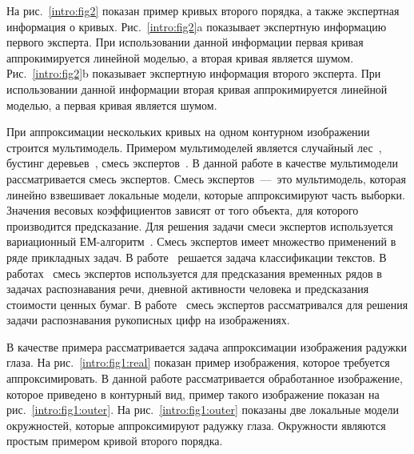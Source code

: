 \documentclass[12pt, twoside]{article}
\numberwithin{equation}{section}
\begin{document}
На рис.~\ref{intro:fig2} показан пример кривых второго порядка, а также экспертная информация о кривых. Рис.~\ref{intro:fig2}a показывает экспертную информацию первого эксперта. При использовании данной информации первая кривая аппрокимируется линейной моделью, а вторая кривая является шумом. Рис.~\ref{intro:fig2}b показывает экспертную информация второго эксперта. При использовании данной информации вторая кривая аппрокимируется линейной моделью, а первая кривая является шумом. 

При аппроксимации нескольких кривых на одном контурном изображении строится мультимодель. Примером мультимоделей является случайный лес~\cite{Ishwaran2012}, бустинг деревьев~\cite{Tianqi2016}, смесь экспертов~\cite{Yuksel2012}. В данной работе в качестве мультимодели рассматривается смесь экспертов. Смесь экспертов~---~это мультимодель, которая линейно взвешивает локальные модели, которые аппроксимируют часть выборки. Значения весовых коэффициентов зависят от того объекта, для которого производится предсказание. Для решения задачи смеси экспертов используется вариационный ЕМ-алгоритм~\cite{Dempster1977, bishop2006, Peng1996}. Смесь экспертов имеет множество применений в ряде прикладных задач. В работе~\cite{Estabrooks2001} решается задача классификации текстов. В работах~\cite{Cheung1995, Weigend2000, Cao2003, Mossavat2010, Sminchisescu2007, Tuerk2001, Yumlu2003} смесь экспертов используется для предсказания временных рядов в задачах распознавания речи, дневной активности человека и предсказания стоимости ценных бумаг. В работе~\cite{Ebrahimpour2009} смесь экспертов рассматривался для решения задачи распознавания рукописных цифр на изображениях.

В качестве примера рассматривается задача аппроксимации изображения радужки глаза. На рис.~\ref{intro:fig1:real} показан пример изображения, которое требуется аппроксимировать. В данной работе рассматривается обработанное изображение, которое приведено в контурный вид, пример такого изображение показан на рис.~\ref{intro:fig1:outer}. На рис.~\ref{intro:fig1:outer} показаны две локальные модели окружностей, которые аппроксимируют радужку глаза. Окружности являются простым примером кривой второго порядка.
\end{document}
